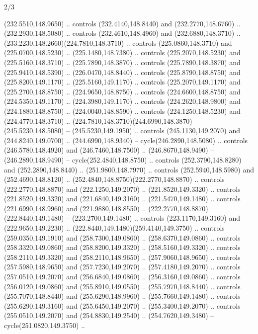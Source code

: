 \begin{flagdescription}{2/3}
\begin{scope}[xshift=0.5\flaglength,yshift=0.5\flagwidth,scale=\flagwidth/259.2]
\begin{scope}[y=0.8pt, x=0.8pt, yscale=-1,shift={(-243,-162)}]
      (232.5510,148.9650) .. controls (232.4140,148.8440) and (232.2770,148.6760) ..
      (232.2930,148.5080) .. controls (232.4610,148.4960) and (232.6880,148.3710) ..
      (233.2230,148.2660)(224.7810,148.3710) .. controls (225.0860,148.3710) and
      (225.0700,148.5230) .. (225.1480,148.7380) .. controls (225.2070,148.5230) and
      (225.5160,148.3710) .. (225.7890,148.3870) .. controls (225.7890,148.3870) and
      (225.9410,148.5390) .. (226.0470,148.8440) .. controls (225.8790,148.8750) and
      (225.8200,149.1170) .. (225.5160,149.1170) .. controls (225.2070,149.1170) and
      (225.2700,148.8750) .. (224.9650,148.8750) .. controls (224.6600,148.8750) and
      (224.5350,149.1170) .. (224.3980,149.1170) .. controls (224.2620,148.9800) and
      (224.1880,148.8750) .. (224.0040,148.8590) .. controls (224.1250,148.5230) and
      (224.4770,148.3710) .. (224.7810,148.3710)(244.6990,148.3870) --
      (245.5230,148.5080) -- (245.5230,149.1950) .. controls (245.1130,149.2070) and
      (244.8240,149.0700) .. (244.6990,148.9340) -- cycle(246.2890,148.5080) ..
      controls (246.5780,148.4920) and (246.7460,148.7500) .. (246.8670,148.9490) --
      (246.2890,148.9490) -- cycle(252.4840,148.8750) .. controls
      (252.3790,148.8280) and (252.2890,148.8440) .. (251.9800,148.7970) .. controls
      (252.5940,148.5980) and (252.4690,148.8120) ..
      (252.4840,148.8750)(222.2770,148.8870) .. controls (222.2770,148.8870) and
      (222.1250,149.2070) .. (221.8520,149.3320) .. controls (221.8520,149.3320) and
      (221.6840,149.3160) .. (221.5470,149.1480) .. controls (221.6990,148.9960) and
      (221.9880,148.8550) .. (222.2770,148.8870)(222.8440,149.1480) --
      (223.2700,149.1480) .. controls (223.1170,149.3160) and (222.9650,149.2230) ..
      (222.8440,149.1480)(259.4140,149.3750) .. controls (259.0350,149.1910) and
      (258.7300,149.0860) .. (258.6370,149.0860) .. controls (258.3320,149.0860) and
      (258.8200,149.3320) .. (258.5160,149.3320) .. controls (258.2110,149.3320) and
      (258.2110,148.9650) .. (257.9060,148.9650) .. controls (257.5980,148.9650) and
      (257.7230,149.2070) .. (257.4180,149.2070) .. controls (257.0510,149.2070) and
      (256.6840,149.0860) .. (256.3160,149.0860) .. controls (256.0120,149.0860) and
      (255.8910,149.0550) .. (255.7970,148.8440) .. controls (255.7070,148.8440) and
      (255.6290,148.9960) .. (255.7660,149.1480) .. controls (255.6290,149.3160) and
      (255.6450,149.2070) .. (255.3400,149.2070) .. controls (255.0510,149.2070) and
      (254.8830,149.2540) .. (254.7620,149.3480) -- cycle(251.0820,149.3750) ..

\end{scope}
\end{scope}
\end{flagdescription}

